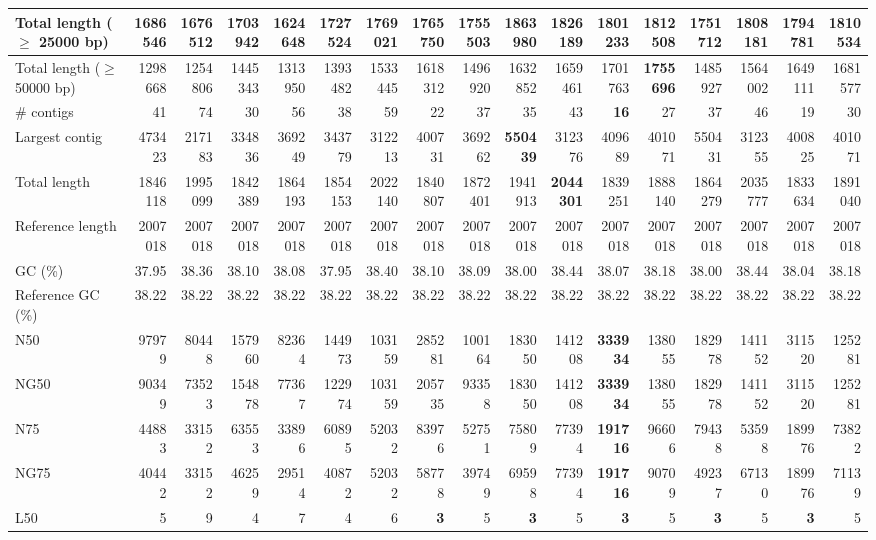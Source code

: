 \documentclass[12pt,a4paper]{article}
\begin{document}
\begin{table}[ht]
\begin{center}
\begin{tabular}{|l*{16}{|r}|}
Total length ($\geq$ 25000 bp) & 1686546 & 1676512 & 1703942 & 1624648 & 1727524 & 1769021 & 1765750 & 1755503 & {\bf 1863980} & 1826189 & 1801233 & 1812508 & 1751712 & 1808181 & 1794781 & 1810534 \\ \hline
Total length ($\geq$ 50000 bp) & 1298668 & 1254806 & 1445343 & 1313950 & 1393482 & 1533445 & 1618312 & 1496920 & 1632852 & 1659461 & 1701763 & {\bf 1755696} & 1485927 & 1564002 & 1649111 & 1681577 \\ \hline
\# contigs & 41 & 74 & 30 & 56 & 38 & 59 & 22 & 37 & 35 & 43 & {\bf 16} & 27 & 37 & 46 & 19 & 30 \\ \hline
Largest contig & 473423 & 217183 & 334836 & 369249 & 343779 & 312213 & 400731 & 369262 & {\bf 550439} & 312376 & 409689 & 401071 & 550431 & 312355 & 400825 & 401071 \\ \hline
Total length & 1846118 & 1995099 & 1842389 & 1864193 & 1854153 & 2022140 & 1840807 & 1872401 & 1941913 & {\bf 2044301} & 1839251 & 1888140 & 1864279 & 2035777 & 1833634 & 1891040 \\ \hline
Reference length & 2007018 & 2007018 & 2007018 & 2007018 & 2007018 & 2007018 & 2007018 & 2007018 & 2007018 & 2007018 & 2007018 & 2007018 & 2007018 & 2007018 & 2007018 & 2007018 \\ \hline
GC (\%) & 37.95 & 38.36 & 38.10 & 38.08 & 37.95 & 38.40 & 38.10 & 38.09 & 38.00 & 38.44 & 38.07 & 38.18 & 38.00 & 38.44 & 38.04 & 38.18 \\ \hline
Reference GC (\%) & 38.22 & 38.22 & 38.22 & 38.22 & 38.22 & 38.22 & 38.22 & 38.22 & 38.22 & 38.22 & 38.22 & 38.22 & 38.22 & 38.22 & 38.22 & 38.22 \\ \hline
N50 & 97979 & 80448 & 157960 & 82364 & 144973 & 103159 & 285281 & 100164 & 183050 & 141208 & {\bf 333934} & 138055 & 182978 & 141152 & 311520 & 125281 \\ \hline
NG50 & 90349 & 73523 & 154878 & 77367 & 122974 & 103159 & 205735 & 93358 & 183050 & 141208 & {\bf 333934} & 138055 & 182978 & 141152 & 311520 & 125281 \\ \hline
N75 & 44883 & 33152 & 63553 & 33896 & 60895 & 52032 & 83976 & 52751 & 75809 & 77394 & {\bf 191716} & 96606 & 79438 & 53598 & 189976 & 73822 \\ \hline
NG75 & 40442 & 33152 & 46259 & 29514 & 40872 & 52032 & 58778 & 39749 & 69598 & 77394 & {\bf 191716} & 90709 & 49237 & 67130 & 189976 & 71139 \\ \hline
L50 & 5 & 9 & 4 & 7 & 4 & 6 & {\bf 3} & 5 & {\bf 3} & 5 & {\bf 3} & 5 & {\bf 3} & 5 & {\bf 3} & 5 \\ \hline

\end{tabular}
\end{center}
\end{table}
\end{document}
